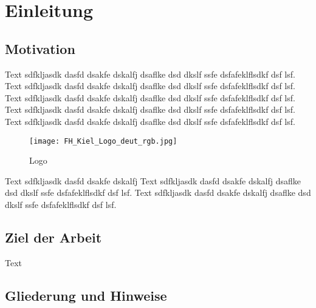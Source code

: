 \chapter{Einleitung}
\label{ch:einleitung}

\section{Motivation}
\label{sec:motivation}

Text sdfkljasdk dasfd dsakfe dskalfj dsaflke dsd dkslf ssfe dsfafeklflsdkf dsf lsf. Text sdfkljasdk dasfd dsakfe dskalfj dsaflke dsd dkslf ssfe dsfafeklflsdkf dsf lsf. Text sdfkljasdk dasfd dsakfe dskalfj dsaflke dsd dkslf ssfe dsfafeklflsdkf dsf lsf. Text sdfkljasdk dasfd dsakfe dskalfj dsaflke dsd dkslf ssfe dsfafeklflsdkf dsf lsf. Text sdfkljasdk dasfd dsakfe dskalfj dsaflke dsd dkslf ssfe dsfafeklflsdkf dsf lsf.

\begin{figure}[ht]
	\centering
	\texttt{[image: FH\_Kiel\_Logo\_deut\_rgb.jpg]}
	\caption{Logo}
	\label{fig:fhlogo}
\end{figure}

Text sdfkljasdk dasfd dsakfe dskalfj Text sdfkljasdk dasfd dsakfe dskalfj dsaflke dsd dkslf ssfe dsfafeklflsdkf dsf lsf. Text sdfkljasdk dasfd dsakfe dskalfj dsaflke dsd dkslf ssfe dsfafeklflsdkf dsf lsf. \cite{gasparovic1969}
\section{Ziel der Arbeit}
\label{sec:ziel}
Text

\section{Gliederung und Hinweise}
\label{sec:gliederung}

\blindtext[2]

\blindtext[3]

\blindtext[5]

\blindtext[3]